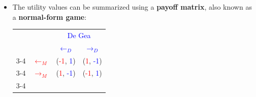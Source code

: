 \documentclass[notitlepage]{article}
\begin{document}
\begin{itemize}
\begin{itemize}
        For Messi:
        \[
        \begin{cases}
            (Goal) \; u_M(\leftarrow_M, \rightarrow_D) = u_M(\rightarrow_M, \leftarrow_D) = 1 \\
            (No \; Goal ) \; u_M(\leftarrow_M, \leftarrow_D) = u_M(\rightarrow_M, \rightarrow_D) = -1
        \end{cases}
        \]
        For De Gea:
        \[
        \begin{cases}
            (No\;Goal) \; u_D(\leftarrow_M, \leftarrow_D) = u_D(\rightarrow_M, \rightarrow_D) = 1 \\
            (Goal ) \; u_D(\leftarrow_M, \rightarrow_D) = u_D(\rightarrow_M, \leftarrow_D) = -1
        \end{cases}
        \]
        \item The utility values can be summarized using a \textbf{payoff matrix}, also known as a \textbf{normal-form game}:

        \begin{table}[h]
        \begin{center}
        \begin{tabular}{llcc}
        &&
        \multicolumn{2}{c}{\textcolor{blue}{De Gea}}  \\&& 
        \textcolor{blue}{$\leftarrow_D$} & 
        \textcolor{blue}{$\rightarrow_D$} 
        \\ \cline{3-4} 
        \multirow{2}{*}{\textcolor{red}{Messi}} & 
        \multicolumn{1}{c|}{\textcolor{red}{$\leftarrow_M$}} & 
        \multicolumn{1}{c|}{(\textcolor{red}{-1}, \textcolor{blue}{1})} &
        \multicolumn{1}{c|}{(\textcolor{red}{1}, \textcolor{blue}{-1})} 
        \\ \cline{3-4} & 
        \multicolumn{1}{c|}{\textcolor{red}{$\rightarrow_M$}} & 
        \multicolumn{1}{c|}{(\textcolor{red}{1}, \textcolor{blue}{-1})} &
        \multicolumn{1}{c|}{(\textcolor{red}{-1}, \textcolor{blue}{1})} 
        \\ \cline{3-4} 
        \end{tabular}
        \end{center}
        \end{table}
    \end{itemize}
\end{itemize}
\end{document}
